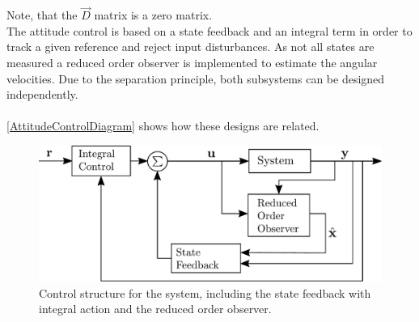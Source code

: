 \noindent Note, that the $\vec{D}$ matrix is a zero matrix.\\
\indent The attitude control is based on a state feedback and an integral term in order to track a given reference and reject input disturbances. As not all states are measured a reduced order observer is implemented to estimate the angular velocities. Due to the separation principle, both subsystems can be designed independently. \cite{ssReference}
\\
\\
\noindent\autoref{AttitudeControlDiagram} shows how these designs are related.
\begin{figure}[H]
    \centering
    \includegraphics[width=.4\textwidth]{figures/AttitudeControlDiagram}
    \caption{ Control structure for the system, including the state feedback with integral action and the reduced order observer.}
    \label{AttitudeControlDiagram}
\end{figure}

